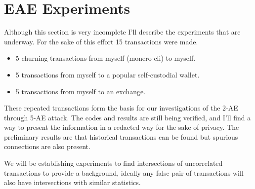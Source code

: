 \section{EAE Experiments}

Although this section is very incomplete I'll describe the experiments that are underway.  
For the sake of this effort 15 transactions were made.  
\begin{itemize}
\item 5 churning transactions from myself (monero-cli) to myself.
\item 5 transactions from myself to a popular self-custodial wallet.
\item 5 transactions from myself to an exchange.  
\end{itemize}

These repeated transactions form the basis for our investigations of the 2-AE through 5-AE attack.  
The codes and results are still being verified, and I'll find a way to present the information in a redacted way for the sake of privacy.
The preliminary results are that historical transactions can be found but spurious connections are also present.

We will be establishing experiments to find intersections of uncorrelated transactions to provide a background, ideally any false pair of transactions will also have intersections with similar statistics.

